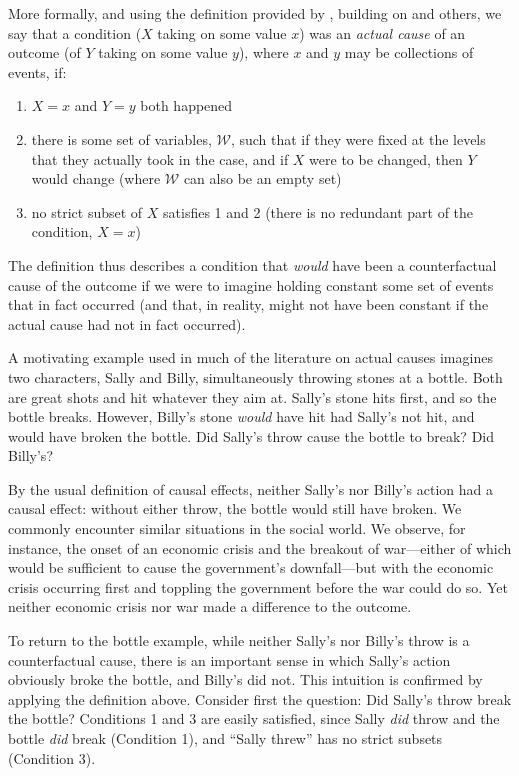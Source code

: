 \documentclass[12pt,]{book}
\providecommand{\tightlist}{%
  \setlength{\itemsep}{0pt}\setlength{\parskip}{0pt}}
\begin{document}
More formally, and using the definition provided by \citep{halpern2015modification}, building on \citep{halpern2005causesa} and others, we say that a condition (\(X\) taking on some value \(x\)) was an \emph{actual cause} of an outcome (of \(Y\) taking on some value \(y\)), where \(x\) and \(y\) may be collections of events, if:

\begin{enumerate}
\def\labelenumi{\arabic{enumi}.}
\tightlist
\item
  \(X=x\) and \(Y=y\) both happened
\item
  there is some set of variables, \(\mathcal W\), such that if they were fixed at the levels that they actually took in the case, and if \(X\) were to be changed, then \(Y\) would change (where \(\mathcal W\) can also be an empty set)
\item
  no strict subset of \(X\) satisfies 1 and 2 (there is no redundant part of the condition, \(X=x\))
\end{enumerate}

The definition thus describes a condition that \emph{would} have been a counterfactual cause of the outcome if we were to imagine holding constant some set of events that in fact occurred (and that, in reality, might not have been constant if the actual cause had not in fact occurred).

A motivating example used in much of the literature on actual causes \citep[e.g.~][]{hall2004two} imagines two characters, Sally and Billy, simultaneously throwing stones at a bottle. Both are great shots and hit whatever they aim at. Sally's stone hits first, and so the bottle breaks. However, Billy's stone \emph{would} have hit had Sally's not hit, and would have broken the bottle. Did Sally's throw cause the bottle to break? Did Billy's?

By the usual definition of causal effects, neither Sally's nor Billy's action had a causal effect: without either throw, the bottle would still have broken. We commonly encounter similar situations in the social world. We observe, for instance, the onset of an economic crisis and the breakout of war---either of which would be sufficient to cause the government's downfall---but with the economic crisis occurring first and toppling the government before the war could do so. Yet neither economic crisis nor war made a difference to the outcome.

To return to the bottle example, while neither Sally's nor Billy's throw is a counterfactual cause, there is an important sense in which Sally's action obviously broke the bottle, and Billy's did not. This intuition is confirmed by applying the definition above. Consider first the question: Did Sally's throw break the bottle? Conditions 1 and 3 are easily satisfied, since Sally \emph{did} throw and the bottle \emph{did} break (Condition 1), and ``Sally threw'' has no strict subsets (Condition 3).
\end{document}
